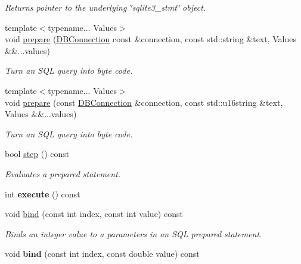 \begin{DoxyCompactItemize}
\begin{DoxyCompactList}\small\item\em Returns pointer to the underlying \char`\"{}sqlite3\-\_\-stmt\char`\"{} object. \end{DoxyCompactList}\item 
{\footnotesize template$<$typename... Values$>$ }\\void \hyperlink{class_s_q_lite_1_1_statement_a1ecd8e2636b542314521eb68fbf1000e}{prepare} (\hyperlink{class_s_q_lite_1_1_d_b_connection}{D\-B\-Connection} const \&connection, const std\-::string \&text, Values \&\&...values)
\begin{DoxyCompactList}\small\item\em Turn an S\-Q\-L query into byte code. \end{DoxyCompactList}\item 
{\footnotesize template$<$typename... Values$>$ }\\void \hyperlink{class_s_q_lite_1_1_statement_a0d422eadca4b2e3f2e1b6e13af69f3cc}{prepare} (const \hyperlink{class_s_q_lite_1_1_d_b_connection}{D\-B\-Connection} \&connection, const std\-::u16string \&text, Values \&\&...values)
\begin{DoxyCompactList}\small\item\em Turn an S\-Q\-L query into byte code. \end{DoxyCompactList}\item 
bool \hyperlink{class_s_q_lite_1_1_statement_a6251d1119e978d1366113b4aa30899ef}{step} () const 
\begin{DoxyCompactList}\small\item\em Evaluates a prepared statement. \end{DoxyCompactList}\item 
\hypertarget{class_s_q_lite_1_1_statement_a9b489a2dc2707543eba55ce1e5d3682c}{int {\bfseries execute} () const }\label{class_s_q_lite_1_1_statement_a9b489a2dc2707543eba55ce1e5d3682c}

\item 
void \hyperlink{class_s_q_lite_1_1_statement_a0d4999fce90145852287c18c0d218ac6}{bind} (const int index, const int value) const 
\begin{DoxyCompactList}\small\item\em Binds an integer value to a parameters in an S\-Q\-L prepared statement. \end{DoxyCompactList}\item 
\hypertarget{class_s_q_lite_1_1_statement_ace8156c735b1e630e82a3840910e02cf}{void {\bfseries bind} (const int index, const double value) const }\label{class_s_q_lite_1_1_statement_ace8156c735b1e630e82a3840910e02cf}


\end{DoxyCompactItemize}
